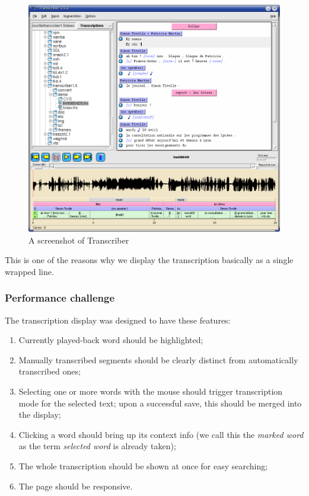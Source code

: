 \documentclass{svproc}
\begin{document}
\begin{figure}[htpb]
\includegraphics[scale=0.4]{rc/transcriber1.png}
\caption{A screenshot of Transcriber}
\label{fig:transcriber1}
\end{figure}

This is one of the reasons why we display the transcription basically as a
single wrapped line.

\subsubsection{Performance challenge}

The transcription display was designed to have these features:
\begin{enumerate}
\item{
    Currently played-back word should be highlighted;
    \label{feats:item:curword}
}
\item{
    Manually transcribed segments should be clearly distinct from automatically
    transcribed ones;
    \label{feats:item:manualdistinct}
}
\item{
    Selecting one or more words with the mouse should trigger transcription mode
    for the selected text;
    upon a successful save, this should be merged into the display;
    \label{feats:item:selectable}
}
\item{
    Clicking a word should bring up its context info (we call this the
    {\em marked word} as the term {\em selected word} is already taken);
    \label{feats:item:clickable}
}
\item{
    The whole transcription should be shown at once for easy searching;
    \label{feats:item:showall}
}
\item{
    The page should be responsive.\label{feats:item:speed}
}
\end{enumerate}
\end{document}
